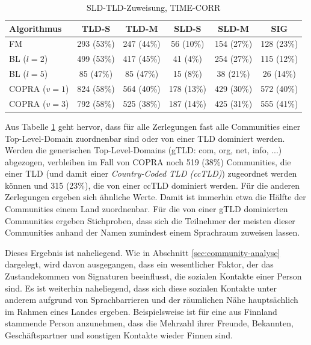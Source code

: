 \begin{table}[t]
  \centering
  \footnotesize
  \begin{tabular}{l|c|c|c|c|c}
    Algorithmus & TLD-S & TLD-M & SLD-S & SLD-M & SIG \\
    \hline
    FM & 293 (53\%) & 247 (44\%) & 56 (10\%) & 154 (27\%) & 128
    (23\%) \\
    \hline
    BL ($l=2$) & 499 (53\%) & 417 (45\%) & 41 (4\%) & 254 (27\%) & 115 (12\%) \\
    BL ($l=5$) & 85 (47\%) & 85 (47\%) & 15 (8\%) & 38 (21\%) & 26 (14\%) \\
    \hline
    COPRA ($v=1$) & 824 (58\%) & 564 (40\%) & 178 (13\%) & 429 (30\%)
    & 572 (40\%) \\
    COPRA ($v=3$) & 792 (58\%) & 525 (38\%) & 187 (14\%) & 425 (31\%) & 555
    (41\%)
  \end{tabular}
  \caption{SLD-TLD-Zuweisung, TIME-CORR}
  \label{tab:assign}
\end{table}


Aus Tabelle \ref{tab:assign} geht hervor, dass f\"ur alle Zerlegungen
fast alle Communities einer Top-Level-Domain zuordnenbar sind oder von
einer TLD dominiert werden. Werden die generischen Top-Level-Domains
(gTLD: com, org, net, info, ...) abgezogen, verbleiben im Fall von COPRA
noch 519 (38\%) Communities, die einer TLD (und damit einer
\emph{Country-Coded TLD (ccTLD)}) zugeordnet werden k\"onnen und 315
(23\%), die von einer ccTLD dominiert werden. F\"ur die anderen
Zerlegungen ergeben sich \"ahnliche Werte. Damit ist immerhin etwa die
H\"alfte der Communities einem Land zuordnenbar. F\"ur die von einer
gTLD dominierten Communities ergeben Stichproben, dass sich die
Teilnehmer der meisten dieser Communities anhand der Namen zumindest
einem Sprachraum zuweisen lassen.

Dieses Ergebnis ist naheliegend. Wie in Abschnitt
\ref{sec:community-analyse} dargelegt, wird davon ausgegangen, dass
ein wesentlicher Faktor, der das Zustandekommen von Signaturen
beeinflusst, die sozialen Kontakte einer Person sind. Es ist weiterhin
naheliegend, dass sich diese sozialen Kontakte unter anderem aufgrund
von Sprachbarrieren und der r\"aumlichen N\"ahe haupts\"achlich im
Rahmen eines Landes ergeben. Beispielsweise ist f\"ur eine aus
Finnland stammende Person anzunehmen, dass die Mehrzahl ihrer Freunde,
Bekannten, Gesch\"aftspartner und sonstigen Kontakte wieder Finnen
sind.


